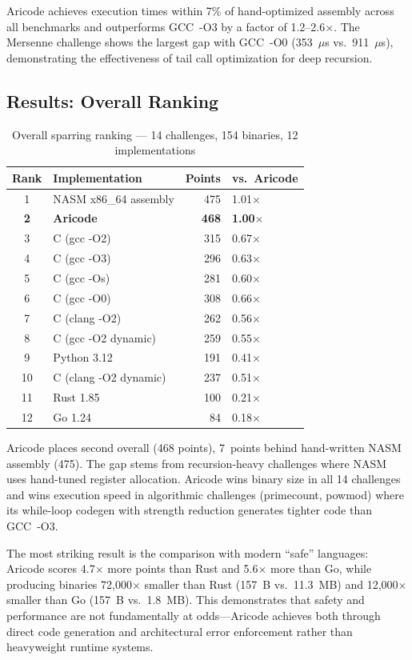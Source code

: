 \documentclass[11pt,a4paper]{article}
\begin{document}
Aricode achieves execution times within 7\% of hand-optimized assembly across all benchmarks and outperforms GCC~-O3 by a factor of 1.2--2.6$\times$. The Mersenne challenge shows the largest gap with GCC~-O0 (353~$\mu$s vs.\ 911~$\mu$s), demonstrating the effectiveness of tail call optimization for deep recursion.

\subsection{Results: Overall Ranking}

\begin{table}[H]
\centering
\caption{Overall sparring ranking --- 14 challenges, 154 binaries, 12 implementations}
\label{tab:ranking}
\begin{tabular}{@{}clrl@{}}
\toprule
\textbf{Rank} & \textbf{Implementation} & \textbf{Points} & \textbf{vs.\ Aricode} \\
\midrule
1 & NASM x86\_64 assembly & 475 & 1.01$\times$ \\
\textbf{2} & \textbf{Aricode} & \textbf{468} & \textbf{1.00$\times$} \\
3 & C (gcc -O2) & 315 & 0.67$\times$ \\
4 & C (gcc -O3) & 296 & 0.63$\times$ \\
5 & C (gcc -Os) & 281 & 0.60$\times$ \\
6 & C (gcc -O0) & 308 & 0.66$\times$ \\
7 & C (clang -O2) & 262 & 0.56$\times$ \\
8 & C (gcc -O2 dynamic) & 259 & 0.55$\times$ \\
9 & Python 3.12 & 191 & 0.41$\times$ \\
10 & C (clang -O2 dynamic) & 237 & 0.51$\times$ \\
11 & Rust 1.85 & 100 & 0.21$\times$ \\
12 & Go 1.24 & 84 & 0.18$\times$ \\
\bottomrule
\end{tabular}
\end{table}

Aricode places second overall (468 points), 7~points behind hand-written NASM assembly (475). The gap stems from recursion-heavy challenges where NASM uses hand-tuned register allocation. Aricode wins binary size in all 14 challenges and wins execution speed in algorithmic challenges (primecount, powmod) where its while-loop codegen with strength reduction generates tighter code than GCC~-O3.

The most striking result is the comparison with modern ``safe'' languages: Aricode scores 4.7$\times$ more points than Rust and 5.6$\times$ more than Go, while producing binaries 72{,}000$\times$ smaller than Rust (157~B vs.\ 11.3~MB) and 12{,}000$\times$ smaller than Go (157~B vs.\ 1.8~MB). This demonstrates that safety and performance are not fundamentally at odds---Aricode achieves both through direct code generation and architectural error enforcement rather than heavyweight runtime systems.
\end{document}
